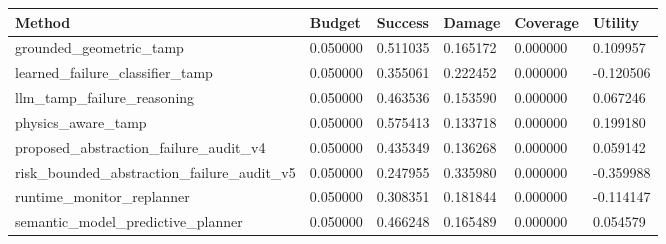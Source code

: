 \begin{tabular}{llllll}
\toprule
Method & Budget & Success & Damage & Coverage & Utility \\
\midrule
grounded\_geometric\_tamp & 0.050000 & 0.511035 & 0.165172 & 0.000000 & 0.109957 \\
learned\_failure\_classifier\_tamp & 0.050000 & 0.355061 & 0.222452 & 0.000000 & -0.120506 \\
llm\_tamp\_failure\_reasoning & 0.050000 & 0.463536 & 0.153590 & 0.000000 & 0.067246 \\
physics\_aware\_tamp & 0.050000 & 0.575413 & 0.133718 & 0.000000 & 0.199180 \\
proposed\_abstraction\_failure\_audit\_v4 & 0.050000 & 0.435349 & 0.136268 & 0.000000 & 0.059142 \\
risk\_bounded\_abstraction\_failure\_audit\_v5 & 0.050000 & 0.247955 & 0.335980 & 0.000000 & -0.359988 \\
runtime\_monitor\_replanner & 0.050000 & 0.308351 & 0.181844 & 0.000000 & -0.114147 \\
semantic\_model\_predictive\_planner & 0.050000 & 0.466248 & 0.165489 & 0.000000 & 0.054579 \\
\bottomrule
\end{tabular}
